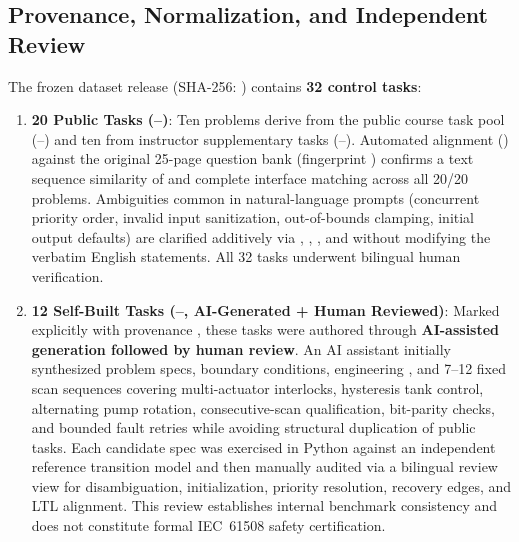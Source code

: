 \subsection{Provenance, Normalization, and Independent Review}
The frozen dataset release  (SHA-256: \texttt{\small{}}) contains \textbf{32 control tasks}:
\begin{enumerate}
  \item \textbf{20 Public Tasks (--)}: Ten problems derive from the public course task pool (--) and ten from instructor supplementary tasks (--). Automated alignment () against the original 25-page question bank (fingerprint ) confirms a text sequence similarity of  and complete interface matching across all 20/20 problems. Ambiguities common in natural-language prompts (concurrent priority order, invalid input sanitization, out-of-bounds clamping, initial output defaults) are clarified additively via , , , and  without modifying the verbatim English statements. All 32 tasks underwent bilingual human verification.
  \item \textbf{12 Self-Built Tasks (--, AI-Generated + Human Reviewed)}: Marked explicitly with provenance , these tasks were authored through \textbf{AI-assisted generation followed by human review}. An AI assistant initially synthesized problem specs, boundary conditions, engineering , and 7--12 fixed scan sequences covering multi-actuator interlocks, hysteresis tank control, alternating pump rotation, consecutive-scan qualification, bit-parity checks, and bounded fault retries while avoiding structural duplication of public tasks. Each candidate spec was exercised in Python against an independent reference transition model and then manually audited via a bilingual review view for disambiguation, initialization, priority resolution, recovery edges, and LTL alignment. This review establishes internal benchmark consistency and does not constitute formal IEC~61508 safety certification.
\end{enumerate}

